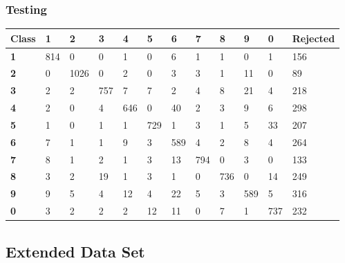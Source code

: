 \documentclass[
  a4paper,            %
  DIV=10,             %
  oneside,            %
  BCOR=5mm,           %
  parskip=half,       %
  numbers=noenddot,   %
  bibtotoc,           %
  listof=totoc,        %
  article
]{scrreprt}
\begin{document}
\subsubsection{Testing}
\begin{center}
  \begin{tabular}{|p{1cm}|p{1cm}|p{1cm}|p{1cm}|p{1cm}|p{1cm}|p{1cm}|p{1cm}|p{1cm}|p{1cm}|p{1cm}|p{1.7cm}|}
    \hline
    \textbf{Class} & \textbf{1} & \textbf{2} & \textbf{3} & \textbf{4} & \textbf{5} & \textbf{6} & \textbf{7} & \textbf{8} & \textbf{9} & \textbf{0} & \textbf{Rejected} \\
    \hline
    \textbf{1} & 814 & 0 & 0 & 1 & 0 & 6 & 1 & 1 & 0 & 1 & 156 \\
    \hline
    \textbf{2} & 0 & 1026 & 0 & 2 & 0 & 3 & 3 & 1 & 11 & 0 & 89 \\
    \hline
    \textbf{3} & 2 & 2 & 757 & 7 & 7 & 2 & 4 & 8 & 21 & 4 & 218 \\
    \hline
    \textbf{4} & 2 & 0 & 4 & 646 & 0 & 40 & 2 & 3 & 9 & 6 & 298 \\
    \hline
    \textbf{5} & 1 & 0 & 1 & 1 & 729 & 1 & 3 & 1 & 5 & 33 & 207 \\
    \hline
    \textbf{6} & 7 & 1 & 1 & 9 & 3 & 589 & 4 & 2 & 8 & 4 & 264 \\
    \hline
    \textbf{7} & 8 & 1 & 2 & 1 & 3 & 13 & 794 & 0 & 3 & 0 & 133 \\
    \hline
    \textbf{8} & 3 & 2 & 19 & 1 & 3 & 1 & 0 & 736 & 0 & 14 & 249 \\
    \hline
    \textbf{9} & 9 & 5 & 4 & 12 & 4 & 22 & 5 & 3 & 589 & 5 & 316 \\
    \hline
    \textbf{0} & 3 & 2 & 2 & 2 & 12 & 11 & 0 & 7 & 1 & 737 & 232 \\
    \hline
  \end{tabular}
\end{center}
\subsection{Extended Data Set}
\end{document}
